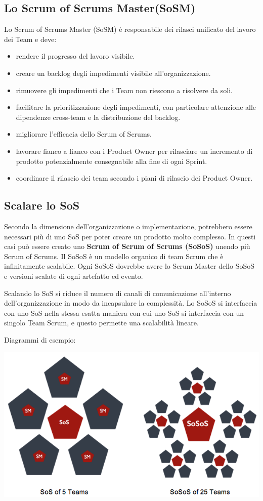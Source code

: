 \documentclass[12pt,a4paper,parskip=full]{scrartcl}
\begin{document}
\subsection{Lo Scrum of Scrums Master(SoSM)}
Lo Scrum of Scrums Master (SoSM) è responsabile dei rilasci unificato del lavoro dei Team e deve:
\begin{itemize}
\item rendere il progresso del lavoro visibile.
\item creare un backlog degli impedimenti visibile all'organizzazione.
\item rimuovere gli impedimenti che i Team non riescono a risolvere da soli. 
\item facilitare la prioritizzazione degli impedimenti, con particolare attenzione alle dipendenze cross-team e la distribuzione del backlog. 
\item migliorare l'efficacia dello Scrum of Scrums.
\item lavorare fianco a fianco con i Product Owner per rilasciare un incremento di prodotto potenzialmente consegnabile alla fine di ogni Sprint.
\item coordinare il rilascio dei team secondo i piani di rilascio dei Product Owner.
\end{itemize}

\subsection{Scalare lo SoS}
Secondo la dimensione dell'organizzazione o implementazione, potrebbero essere necessari più di uno SoS per poter creare un prodotto molto complesso. In questi casi può essere creato uno \textbf{Scrum of Scrum of Scrums (SoSoS)} unendo più Scrum of Scrums. Il SoSoS è un modello organico di team Scrum che è infinitamente scalabile. Ogni SoSoS dovrebbe avere lo Scrum Master dello SoSoS e versioni scalate di ogni artefatto ed evento.

Scalando lo SoS si riduce il numero di canali di comunicazione all'interno dell'organizzazione in modo da incapsulare la complessità. Lo SoSoS si interfaccia con uno SoS nella stessa esatta maniera con cui uno SoS si interfaccia con un singolo Team Scrum, e questo permette una scalabilità lineare.

\pagebreak
Diagrammi di esempio:

\includegraphics[width=1.0\linewidth]{Sos-R2.png}
\end{document}
